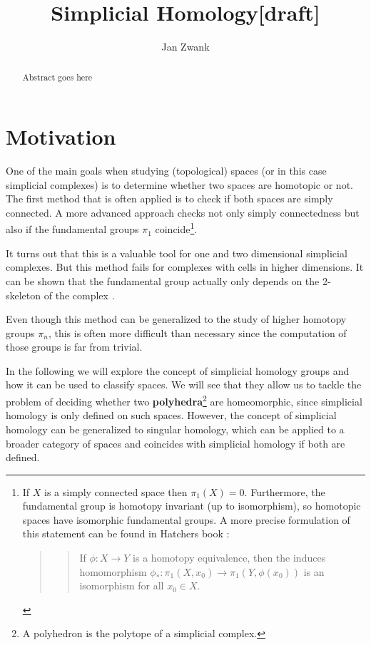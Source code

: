 \documentclass[draft,toc=bib]{scrartcl}
\title{Simplicial Homology[draft]}
\author{Jan Zwank}
\theoremstyle{plain}
\theoremstyle{definition}
\theoremstyle{remark}
\newcommand{\sh}{simplicial homology}
\newcommand{\scs}{simplicial complexes}
\begin{document}
	\maketitle
	
	\begin{abstract}
		Abstract goes here
	\end{abstract}
\tableofcontents

\clearpage

\section{Motivation}\label{motivation}
One of the main goals when studying (topological) spaces (or in this case \scs) is to determine whether two spaces are homotopic
 or not. The first method that is often applied is to check if both spaces are simply connected. A more advanced approach checks not only simply connectedness but also if the fundamental groups $\pi_1$ coincide\footnote{If $X$ is a simply connected space then $\pi_1(X)=0$. Furthermore, the fundamental group is homotopy invariant (up to isomorphism), so homotopic spaces have isomorphic fundamental groups. A more precise formulation of this statement can be found in Hatchers book \parencite[Prop. 1.18, p. 37]{ha}:
\begin{quotation}
	\begin{quote}
		If $\phi: X\to Y$ is a homotopy equivalence, then the induces homomorphism $\phi_*:\pi_1(X,x_0)\to\pi_1(Y,\phi(x_0))$ is an isomorphism for all $x_0\in X$.
	\end{quote}
\end{quotation} }.

It turns out that this is a valuable tool for one and two dimensional \scs. But this method fails for complexes with cells in higher dimensions. It can be shown that the fundamental group actually only depends on the 2-skeleton of the complex \cite[vgl.][p. 173]{ar}. 

Even though this method can be generalized to the study of higher homotopy groups $\pi_n$, this is often more difficult than necessary since the computation of those groups is far from trivial.

In the following we will explore the concept of \sh{} groups and how it can be used to classify spaces. We will see that they allow us to tackle the problem of deciding whether two \textbf{polyhedra}\footnote{A polyhedron is the polytope of a simplicial complex.} are homeomorphic, since simplicial homology is only defined on such spaces. However, the concept of \sh{} can be generalized to singular homology, which can be applied to a broader category of spaces and coincides with \sh{} if both are defined.
\end{document}
